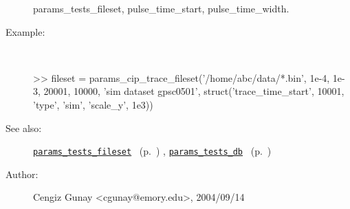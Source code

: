 \begin{description}
	params\_tests\_fileset,
	pulse\_time\_start, pulse\_time\_width.
%
\item[Example:]~
\begin{lyxcode}        >> fileset = params\_cip\_trace\_fileset('/home/abc/data/*.bin', 1e-4, 1e-3, 20001, 10000, 'sim dataset gpsc0501', struct('trace\_time\_start', 10001, 'type', 'sim', 'scale\_y', 1e3))
\\%
\end{lyxcode}
%
\item[See also:]%
\hyperlink{ref_params_tests_fileset}{\texttt{params\_tests\_fileset}}%
\ (p.~\pageref{ref_params_tests_fileset})%
%
, \hyperlink{ref_params_tests_db}{\texttt{params\_tests\_db}}%
\ (p.~\pageref{ref_params_tests_db})%
%
%
\item[Author:]%
Cengiz Gunay <cgunay@emory.edu>, 2004/09/14
%
\end{description}
\methodline%
